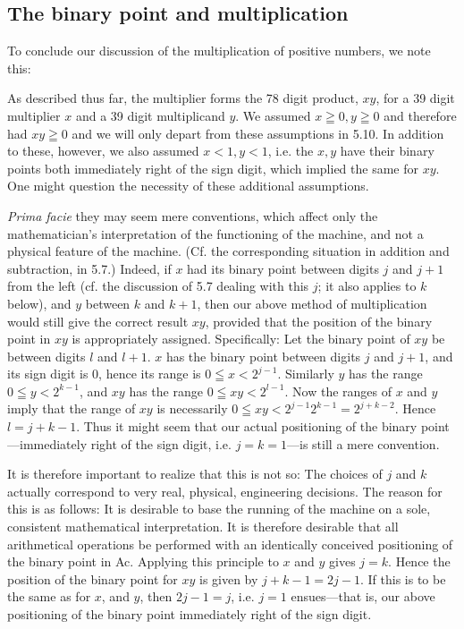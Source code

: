 \documentclass[12pt]{amsart}
\begin{document}
\subsection{The binary point and multiplication}
To conclude our discussion of the multiplication of positive numbers, we note this:

As described thus far, the multiplier forms the 78 digit product, $xy$, for a 39 digit multiplier $x$ and a 39 digit multiplicand $y$. We assumed $x \geqq 0, y \geqq 0$ and therefore had $xy \geqq 0$ and we will only depart from these assumptions in 5.10. In addition to these, however, we also assumed $x < 1, y < 1$, i.e. the $x, y$ have their binary points both immediately right of the sign digit, which implied the same for $xy$. One might question the necessity of these additional assumptions.

\emph{Prima facie} they may seem mere conventions, which affect only the mathematician's interpretation of the functioning of the machine, and not a physical feature of the machine. (Cf. the corresponding situation in addition and subtraction, in 5.7.) Indeed, if $x$ had its binary point between digits $j$ and $j + 1$ from the left (cf. the discussion of 5.7 dealing with this $j$; it also applies to $k$ below), and $y$ between $k$ and $k + 1$, then our above method of multiplication would still give the correct result $xy$, provided that the position of the binary point in $xy$ is appropriately assigned. Specifically: Let the binary point of $xy$ be between digits $l$ and $l + 1$. $x$ has the binary point between digits $j$ and $j + 1$, and its sign digit is 0, hence its range is $0 \leqq x < 2^{j-1}$. Similarly $y$ has the range $0 \leqq y < 2^{k-1}$, and $xy$ has the range $0 \leqq xy < 2^{l-1}$. Now the ranges of $x$ and $y$ imply that the range of $xy$ is necessarily $0 \leqq xy < 2^{j-1}2^{k-1} = 2^{j + k - 2}$. Hence $l = j + k - 1$. Thus it might seem that our actual positioning of the binary point---immediately right of the sign digit, i.e. $j = k = 1$---is still a mere convention.

It is therefore important to realize that this is not so: The choices of $j$ and $k$ actually correspond to very real, physical, engineering decisions. The reason for this is as follows: It is desirable to base the running of the machine on a sole, consistent mathematical interpretation. It is therefore desirable that all arithmetical operations be performed with an identically conceived positioning of the binary point in Ac. Applying this principle to $x$ and $y$ gives $j = k$. Hence the position of the binary point for $xy$ is given by $j + k - 1 = 2j- 1$. If this is to be the same as for $x$, and $y$, then $2j - 1 = j$, i.e. $j = 1$ ensues---that is, our above positioning of the binary point immediately right of the sign digit.
\end{document}
